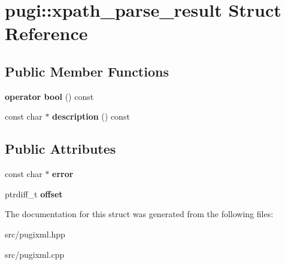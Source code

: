 \hypertarget{structpugi_1_1xpath__parse__result}{}\section{pugi\+:\+:xpath\+\_\+parse\+\_\+result Struct Reference}
\label{structpugi_1_1xpath__parse__result}
\subsection*{Public Member Functions}
\begin{DoxyCompactItemize}
\item 
\mbox{\label{structpugi_1_1xpath__parse__result_a5335412319dc9494bc8b9359458a1e34}} 
{\bfseries operator bool} () const
\item 
\mbox{\label{structpugi_1_1xpath__parse__result_a9329d6f1a0ebf3722dac2297d6835464}} 
const char $\ast$ {\bfseries description} () const
\end{DoxyCompactItemize}
\subsection*{Public Attributes}
\begin{DoxyCompactItemize}
\item 
\mbox{\label{structpugi_1_1xpath__parse__result_ab2c625be89b995afac829012bc749fe4}} 
const char $\ast$ {\bfseries error}
\item 
\mbox{\label{structpugi_1_1xpath__parse__result_add47d886c654b4d8a836573b2c2a7acb}} 
ptrdiff\+\_\+t {\bfseries offset}
\end{DoxyCompactItemize}


The documentation for this struct was generated from the following files\+:\begin{DoxyCompactItemize}
\item 
src/pugixml.\+hpp\item 
src/pugixml.\+cpp\end{DoxyCompactItemize}
